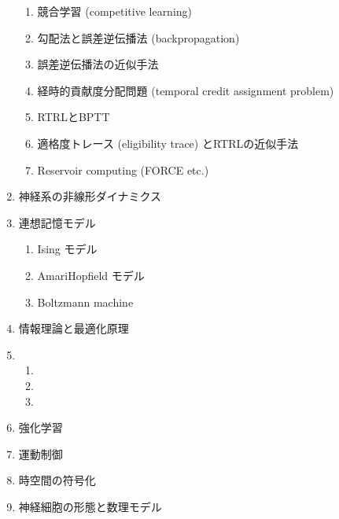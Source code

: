 \documentclass[letterpaper,10pt,english]{sphinxmanual}
\begin{document}
\begin{enumerate}
\begin{enumerate}
\item {} 
競合学習 (competitive learning)

\item {} 
勾配法と誤差逆伝播法 (backpropagation)

\item {} 
誤差逆伝播法の近似手法

\item {} 
経時的貢献度分配問題 (temporal credit assignment problem)

\item {} 
RTRLとBPTT

\item {} 
適格度トレース (eligibility trace) とRTRLの近似手法

\item {} 
Reservoir computing (FORCE etc.)

\end{enumerate}

\item {} 
神経系の非線形ダイナミクス

\item {} 
連想記憶モデル
\begin{enumerate}
%
\item {} 
Ising モデル

\item {} 
Amari\sphinxhyphen{}Hopfield モデル

\item {} 
Boltzmann machine

\end{enumerate}

\item {} 
情報理論と最適化原理

\item {} 
\begin{enumerate}
%
\item {} 

\item {} 

\item {} 

\end{enumerate}

\item {} 
強化学習

\item {} 
運動制御

\item {} 
時空間の符号化

\item {} 
神経細胞の形態と数理モデル

\end{enumerate}
\end{document}
